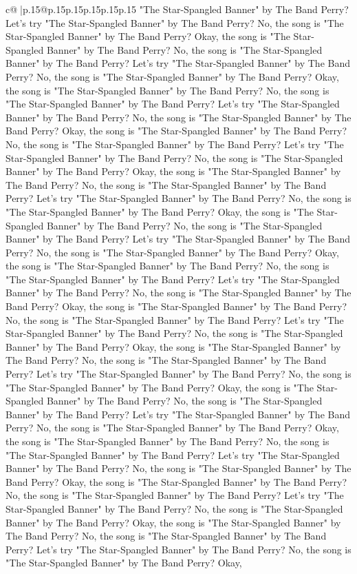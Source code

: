 \documentclass{article}
\begin{document}
{\begin{supertabular}{c@{$\;$}|p{.15\linewidth}@{}p{.15\linewidth}p{.15\linewidth}p{.15\linewidth}p{.15\linewidth}p{.15\linewidth}}
{{{"The Star{-}Spangled Banner" by The Band Perry? Let's try "The Star{-}Spangled Banner" by The Band Perry? No, the song is "The Star{-}Spangled Banner" by The Band Perry? Okay, the song is "The Star{-}Spangled Banner" by The Band Perry? No, the song is "The Star{-}Spangled Banner" by The Band Perry? Let's try "The Star{-}Spangled Banner" by The Band Perry? No, the song is "The Star{-}Spangled Banner" by The Band Perry? Okay, the song is "The Star{-}Spangled Banner" by The Band Perry? No, the song is "The Star{-}Spangled Banner" by The Band Perry? Let's try "The Star{-}Spangled Banner" by The Band Perry? No, the song is "The Star{-}Spangled Banner" by The Band Perry? Okay, the song is "The Star{-}Spangled Banner" by The Band Perry? No, the song is "The Star{-}Spangled Banner" by The Band Perry? Let's try "The Star{-}Spangled Banner" by The Band Perry? No, the song is "The Star{-}Spangled Banner" by The Band Perry? Okay, the song is "The Star{-}Spangled Banner" by The Band Perry? No, the song is "The Star{-}Spangled Banner" by The Band Perry? Let's try "The Star{-}Spangled Banner" by The Band Perry? No, the song is "The Star{-}Spangled Banner" by The Band Perry? Okay, the song is "The Star{-}Spangled Banner" by The Band Perry? No, the song is "The Star{-}Spangled Banner" by The Band Perry? Let's try "The Star{-}Spangled Banner" by The Band Perry? No, the song is "The Star{-}Spangled Banner" by The Band Perry? Okay, the song is "The Star{-}Spangled Banner" by The Band Perry? No, the song is "The Star{-}Spangled Banner" by The Band Perry? Let's try "The Star{-}Spangled Banner" by The Band Perry? No, the song is "The Star{-}Spangled Banner" by The Band Perry? Okay, the song is "The Star{-}Spangled Banner" by The Band Perry? No, the song is "The Star{-}Spangled Banner" by The Band Perry? Let's try "The Star{-}Spangled Banner" by The Band Perry? No, the song is "The Star{-}Spangled Banner" by The Band Perry? Okay, the song is "The Star{-}Spangled Banner" by The Band Perry? No, the song is "The Star{-}Spangled Banner" by The Band Perry? Let's try "The Star{-}Spangled Banner" by The Band Perry? No, the song is "The Star{-}Spangled Banner" by The Band Perry? Okay, the song is "The Star{-}Spangled Banner" by The Band Perry? No, the song is "The Star{-}Spangled Banner" by The Band Perry? Let's try "The Star{-}Spangled Banner" by The Band Perry? No, the song is "The Star{-}Spangled Banner" by The Band Perry? Okay, the song is "The Star{-}Spangled Banner" by The Band Perry? No, the song is "The Star{-}Spangled Banner" by The Band Perry? Let's try "The Star{-}Spangled Banner" by The Band Perry? No, the song is "The Star{-}Spangled Banner" by The Band Perry? Okay, the song is "The Star{-}Spangled Banner" by The Band Perry? No, the song is "The Star{-}Spangled Banner" by The Band Perry? Let's try "The Star{-}Spangled Banner" by The Band Perry? No, the song is "The Star{-}Spangled Banner" by The Band Perry? Okay, the song is "The Star{-}Spangled Banner" by The Band Perry? No, the song is "The Star{-}Spangled Banner" by The Band Perry? Let's try "The Star{-}Spangled Banner" by The Band Perry? No, the song is "The Star{-}Spangled Banner" by The Band Perry? Okay, }}}
\end{supertabular}}
\end{document}
